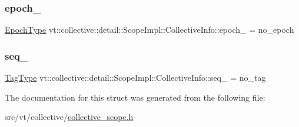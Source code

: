 \subsubsection{\texorpdfstring{epoch\+\_\+}{epoch\_}}
{\footnotesize\ttfamily \hyperlink{namespacevt_a985a5adf291c34a3ca263b3378388236}{Epoch\+Type} vt\+::collective\+::detail\+::\+Scope\+Impl\+::\+Collective\+Info\+::epoch\+\_\+ = no\+\_\+epoch}

\mbox{\label{structvt_1_1collective_1_1detail_1_1_scope_impl_1_1_collective_info_ae8212822c750374cb79a37fe0ef21d7e}} 
\subsubsection{\texorpdfstring{seq\+\_\+}{seq\_}}
{\footnotesize\ttfamily \hyperlink{namespacevt_a84ab281dae04a52a4b243d6bf62d0e52}{Tag\+Type} vt\+::collective\+::detail\+::\+Scope\+Impl\+::\+Collective\+Info\+::seq\+\_\+ = no\+\_\+tag}



The documentation for this struct was generated from the following file\+:\begin{DoxyCompactItemize}
\item 
src/vt/collective/\hyperlink{collective__scope_8h}{collective\+\_\+scope.\+h}\end{DoxyCompactItemize}
